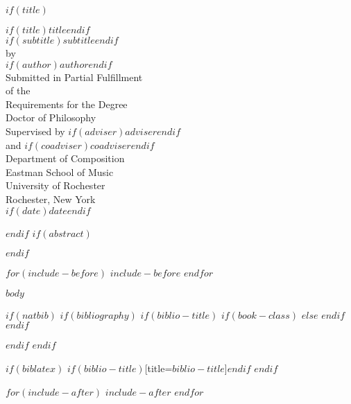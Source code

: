 \documentclass[$if(fontsize)$$fontsize$,$endif$$if(lang)$$babel-lang$,$endif$$if(papersize)$$papersize$paper,$endif$$for(classoption)$$classoption$$sep$,$endfor$]{$documentclass$}
\def\titlepage{
    \thispagestyle{empty}
    \begin{center}
        \parindent=0pt
        {\large{$if(title)$$title$$endif$}} \\ [8pt]
        {\large{$if(subtitle)$$subtitle$$endif$}} \\
        \vskip 18pt
        by \\ [8pt]
        $if(author)$$author$$endif$ \\ [8pt]
        \vskip 18pt
        Submitted in Partial Fulfillment \\ [8pt]
        of the \\ [8pt]
        Requirements for the Degree \\ [8pt]
        Doctor of Philosophy \\ [8pt]
        \vskip 18pt
        Supervised by $if(adviser)$$adviser$$endif$ \\ [8pt]
        and $if(coadviser)$$coadviser$$endif$ \\ [8pt]
        Department of \expandafter{Composition} \\ [8pt]
        Eastman School of Music \\ [8pt]
        \vskip 24pt
        University of Rochester \\ [8pt]
        Rochester, New York \\ [8pt]
        $if(date)$$date$$endif$
    \end{center}
    \newpage
    \pagestyle{fancy}
}
\begin{document}
  $if(title)$
    \titlepage
  $endif$
  $if(abstract)$
    \begin{abstract}
      $abstract$
    \end{abstract}
  $endif$

  $for(include-before)$
    $include-before$
  $endfor$


  $body$

  $if(natbib)$
    $if(bibliography)$
      $if(biblio-title)$
        $if(book-class)$
          \renewcommand\bibname{$biblio-title$}
        $else$
          \renewcommand\refname{$biblio-title$}
        $endif$
      $endif$
    
    $endif$
  $endif$

  $if(biblatex)$
    \printbibliography$if(biblio-title)$[title=$biblio-title$]$endif$
  $endif$

  $for(include-after)$
    $include-after$
  $endfor$
\end{document}
